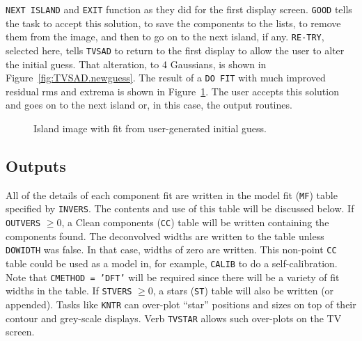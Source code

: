 \documentclass[twoside]{article}
\newcommand{\putfig}[1]{\texttt{[image: \#1.eps]}}
\begin{document}
{\tt NEXT ISLAND} and {\tt EXIT} function as they did for the first
display screen.  {\tt GOOD} tells the task to accept this solution, to
save the components to the lists, to remove them from the image, and
then to go on to the next island, if any.  {\tt RE-TRY}, selected
here, tells {\tt TVSAD} to return to the first display to allow the
user to alter the initial guess.  That alteration, to 4 Gaussians, is
shown in Figure~\ref{fig:TVSAD.newguess}.  The result of a {\tt DO
  FIT} with much improved residual rms and extrema is shown in
Figure~\ref{fig:TVSAD.goodfit}.  The user accepts this solution and
goes on to the next island or, in this case, the output routines.

\begin{figure}
\begin{center}
\resizebox{6.0in}{!}{\putfig{TVSAD.4}}
\caption{Island image with fit from user-generated initial
  guess.}
\label{fig:TVSAD.goodfit}
\end{center}
\end{figure}

\vfill\eject
\subsection{Outputs}

All of the details of each component fit are written in the model fit
({\tt MF}) table specified by {\tt INVERS}\@.  The contents and use of
this table will be discussed below.  If {\tt OUTVERS} $\ge 0$, a Clean
components ({\tt CC}) table will be written containing the components
found.  The deconvolved widths are written to the table unless {\tt
  DOWIDTH} was false.  In that case, widths of zero are written.  This
non-point {\tt CC} table could be used as a model in, for example,
{\tt CALIB} to do a self-calibration.  Note that {\tt CMETHOD =
  'DFT'} will be required since there will be a variety of fit widths
in the table.  If {\tt STVERS} $\ge 0$, a stars ({\tt ST}) table will
also be written (or appended).  Tasks like {\tt KNTR} can over-plot
``star'' positions and sizes on top of their contour and grey-scale
displays.  Verb {\tt TVSTAR} allows such over-plots on the TV screen.
\end{document}
